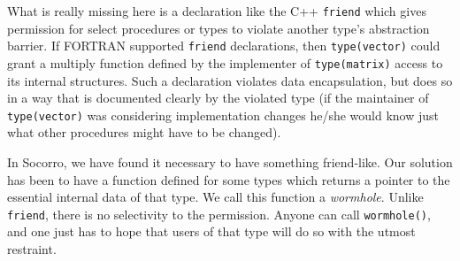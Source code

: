 What is really missing here is a declaration like the C++
\verb+friend+ which gives permission for select procedures or types to
violate another type's abstraction barrier.  If FORTRAN supported
\verb+friend+ declarations, then \verb+type(vector)+ could grant
a multiply function defined by the implementer of \verb+type(matrix)+
access to its internal structures.  Such a declaration violates data
encapsulation, but does so in a way that is documented clearly by the
violated type (if the maintainer of \verb+type(vector)+ was considering
implementation changes he/she would know just what other procedures
might have to be changed).

In Socorro, we have found it necessary to have something friend-like.
Our solution has been to have a function defined for some types which
returns a pointer to the essential internal data of that type.  
We call this function a {\em wormhole}.  Unlike
\verb+friend+, there is no selectivity to the permission.  Anyone
can call \verb+wormhole()+, and one just has to hope that users of
that type will do so with the utmost restraint.












